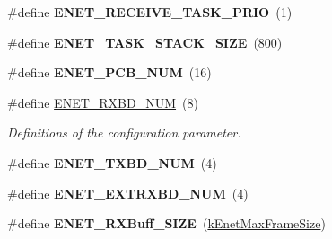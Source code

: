\begin{DoxyCompactItemize}
\item 
\#define {\bfseries E\+N\+E\+T\+\_\+\+R\+E\+C\+E\+I\+V\+E\+\_\+\+T\+A\+S\+K\+\_\+\+P\+R\+IO}~(1)\hypertarget{group__enet__rtcs__adaptor_ga31f7a88a2fa56eb3214e225bb40eb806}{}\label{group__enet__rtcs__adaptor_ga31f7a88a2fa56eb3214e225bb40eb806}

\item 
\#define {\bfseries E\+N\+E\+T\+\_\+\+T\+A\+S\+K\+\_\+\+S\+T\+A\+C\+K\+\_\+\+S\+I\+ZE}~(800)\hypertarget{group__enet__rtcs__adaptor_ga76462c24586fbcc05581d0b3644f8cb3}{}\label{group__enet__rtcs__adaptor_ga76462c24586fbcc05581d0b3644f8cb3}

\item 
\#define {\bfseries E\+N\+E\+T\+\_\+\+P\+C\+B\+\_\+\+N\+UM}~(16)\hypertarget{group__enet__rtcs__adaptor_gafde5bafd8d22cbb24d87bccbb242b8c0}{}\label{group__enet__rtcs__adaptor_gafde5bafd8d22cbb24d87bccbb242b8c0}

\item 
\#define \hyperlink{group__enet__rtcs__adaptor_ga7827f81ac7a45589415eafa9d6ca9611}{E\+N\+E\+T\+\_\+\+R\+X\+B\+D\+\_\+\+N\+UM}~(8)\hypertarget{group__enet__rtcs__adaptor_ga7827f81ac7a45589415eafa9d6ca9611}{}\label{group__enet__rtcs__adaptor_ga7827f81ac7a45589415eafa9d6ca9611}

\begin{DoxyCompactList}\small\item\em Definitions of the configuration parameter. \end{DoxyCompactList}\item 
\#define {\bfseries E\+N\+E\+T\+\_\+\+T\+X\+B\+D\+\_\+\+N\+UM}~(4)\hypertarget{group__enet__rtcs__adaptor_ga937a76d2a35dd5dcfee1b6a5af133279}{}\label{group__enet__rtcs__adaptor_ga937a76d2a35dd5dcfee1b6a5af133279}

\item 
\#define {\bfseries E\+N\+E\+T\+\_\+\+E\+X\+T\+R\+X\+B\+D\+\_\+\+N\+UM}~(4)\hypertarget{group__enet__rtcs__adaptor_gaf4dfa6f3bb31d37f916340bdc6b42fd5}{}\label{group__enet__rtcs__adaptor_gaf4dfa6f3bb31d37f916340bdc6b42fd5}

\item 
\#define {\bfseries E\+N\+E\+T\+\_\+\+R\+X\+Buff\+\_\+\+S\+I\+ZE}~(\hyperlink{group__enet__driver_gga9f232f6ffcec5c632ffbdb26312d2925af383e7bd05019bc27865dd15eed5e213}{k\+Enet\+Max\+Frame\+Size})\hypertarget{group__enet__rtcs__adaptor_ga51bea139b48ed6c1bf11687e9e3620bf}{}\label{group__enet__rtcs__adaptor_ga51bea139b48ed6c1bf11687e9e3620bf}


\end{DoxyCompactItemize}
